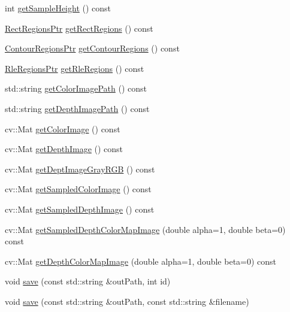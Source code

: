 \begin{DoxyCompactItemize}
int \hyperlink{struct_sample_a7e18614451f5a983bba865592b661eea}{get\+Sample\+Height} () const
\item 
\hyperlink{_rect_regions_8h_af395a1050a923eecf6862568feaf5d1d}{Rect\+Regions\+Ptr} \hyperlink{struct_sample_a5f1b7716e5c4e8f5217a18021169283f}{get\+Rect\+Regions} () const
\item 
\hyperlink{_contour_regions_8h_a3a7590ecfb061e3c09270d38b53671ef}{Contour\+Regions\+Ptr} \hyperlink{struct_sample_aa70ac3682cd06e667b4daab50ffc66fb}{get\+Contour\+Regions} () const
\item 
\hyperlink{_rle_regions_8h_a9bcb41ed7094063e159a665178703e0f}{Rle\+Regions\+Ptr} \hyperlink{struct_sample_aba47baeaed03136d0b63ca6609de25a7}{get\+Rle\+Regions} () const
\item 
std\+::string \hyperlink{struct_sample_a2991d3bc768b12e84c51f52381dad944}{get\+Color\+Image\+Path} () const
\item 
std\+::string \hyperlink{struct_sample_a7484f917e461198bd49138149920955e}{get\+Depth\+Image\+Path} () const
\item 
cv\+::\+Mat \hyperlink{struct_sample_abf69bbc9b312c22d3ded30d30d1e278f}{get\+Color\+Image} () const
\item 
cv\+::\+Mat \hyperlink{struct_sample_a4d2e91f909467a974832c9359cc81c3c}{get\+Depth\+Image} () const
\item 
cv\+::\+Mat \hyperlink{struct_sample_ac1506dc52a2f8b5bcb130c380492b784}{get\+Dept\+Image\+Gray\+R\+GB} () const
\item 
cv\+::\+Mat \hyperlink{struct_sample_a19aef3e998d244412a87c9d7760d0937}{get\+Sampled\+Color\+Image} () const
\item 
cv\+::\+Mat \hyperlink{struct_sample_a8e31cb70e624975d18e617dc7f71f9a1}{get\+Sampled\+Depth\+Image} () const
\item 
cv\+::\+Mat \hyperlink{struct_sample_a4bd0f24d929a2559152a88d7669c84a2}{get\+Sampled\+Depth\+Color\+Map\+Image} (double alpha=1, double beta=0) const
\item 
cv\+::\+Mat \hyperlink{struct_sample_ae6488ecd5c5996029a68915541b01245}{get\+Depth\+Color\+Map\+Image} (double alpha=1, double beta=0) const
\item 
void \hyperlink{struct_sample_a2c873df91344017f41f144af9baa3b7c}{save} (const std\+::string \&out\+Path, int id)
\item 
void \hyperlink{struct_sample_a8e2faad4265f473f102594897a06ae1d}{save} (const std\+::string \&out\+Path, const std\+::string \&filename)
\item 

\end{DoxyCompactItemize}
